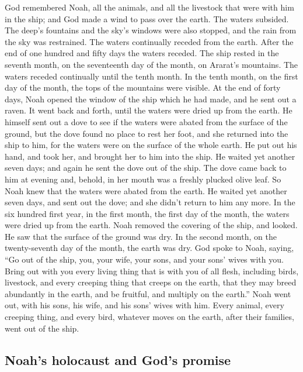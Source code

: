  God remembered Noah, all the animals, and all the
livestock that were with him in the ship; and God made a wind to pass
over the earth. The waters subsided.  The deep's fountains
and the sky's windows were also stopped, and the rain from the sky was
restrained.  The waters continually receded from the
earth. After the end of one hundred and fifty days the waters receded.
 The ship rested in the seventh month, on the seventeenth
day of the month, on Ararat's mountains.  The waters
receded continually until the tenth month. In the tenth month, on the
first day of the month, the tops of the mountains were visible.
 At the end of forty days, Noah opened the window of the
ship which he had made,  and he sent out a raven. It went
back and forth, until the waters were dried up from the earth.
 He himself sent out a dove to see if the waters were
abated from the surface of the ground,  but the dove found
no place to rest her foot, and she returned into the ship to him, for
the waters were on the surface of the whole earth. He put out his hand,
and took her, and brought her to him into the ship.  He
waited yet another seven days; and again he sent the dove out of the
ship.  The dove came back to him at evening and, behold,
in her mouth was a freshly plucked olive leaf. So Noah knew that the
waters were abated from the earth.  He waited yet another
seven days, and sent out the dove; and she didn't return to him any
more.  In the six hundred first year, in the first month,
the first day of the month, the waters were dried up from the earth.
Noah removed the covering of the ship, and looked. He saw that the
surface of the ground was dry.  In the second month, on
the twenty-seventh day of the month, the earth was dry. 
God spoke to Noah, saying,  ``Go out of the ship, you,
your wife, your sons, and your sons' wives with you. 
Bring out with you every living thing that is with you of all flesh,
including birds, livestock, and every creeping thing that creeps on the
earth, that they may breed abundantly in the earth, and be fruitful, and
multiply on the earth.''  Noah went out, with his sons,
his wife, and his sons' wives with him.  Every animal,
every creeping thing, and every bird, whatever moves on the earth, after
their families, went out of the ship.

\hypertarget{noahs-holocaust-and-gods-promise}{%
\subsection{Noah's holocaust and God's
promise}\label{noahs-holocaust-and-gods-promise}}


